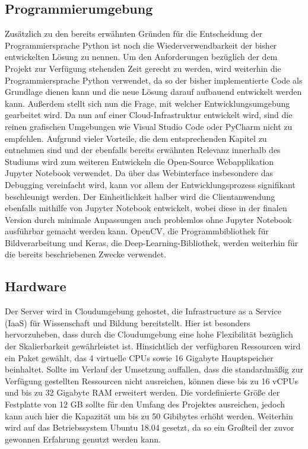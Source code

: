\documentclass[12pt, a4paper]{report}
\begin{document}
\subsection{Programmierumgebung}
Zusätzlich zu den bereits erwähnten Gründen für die Entscheidung der Programmiersprache Python ist noch die Wiederverwendbarkeit der bisher entwickelten Lösung zu nennen. Um den Anforderungen bezüglich der dem Projekt zur Verfügung stehenden Zeit gerecht zu werden, wird weiterhin die Programmiersprache Python verwendet, da so der bisher implementierte Code als Grundlage dienen kann und die neue Lösung darauf aufbauend entwickelt werden kann.
Außerdem stellt sich nun die Frage, mit welcher Entwicklungsumgebung gearbeitet wird. Da nun auf einer Cloud-Infrastruktur entwickelt wird, sind die reinen grafischen Umgebungen wie Visual Studio Code oder PyCharm nicht zu empfehlen. Aufgrund vieler Vorteile, die dem entsprechenden Kapitel zu entnehmen sind und der ebenfalls bereits erwähnten Relevanz innerhalb des Studiums wird zum weiteren Entwickeln die Open-Source Webapplikation Jupyter Notebook verwendet. Da über das Webinterface insbesondere das Debugging vereinfacht wird, kann vor allem der Entwicklungsprozess signifikant beschleunigt werden. Der Einheitlichkeit halber wird die Clientanwendung ebenfalls mithilfe von Jupyter Notebook entwickelt, wobei diese in der finalen Version durch minimale Anpassungen auch problemlos ohne Jupyter Notebook ausführbar gemacht werden kann. OpenCV, die Programmbibliothek für Bildverarbeitung und Keras, die Deep-Learning-Bibliothek, werden weiterhin für die bereits beschriebenen Zwecke verwendet.

\subsection{Hardware}
Der Server wird in Cloudumgebung gehostet, die Infrastructure as a Service (IaaS) für Wissenschaft und Bildung bereitstellt. Hier ist besonders hervorzuheben, dass durch die Cloudumgebung eine hohe Flexibilität bezüglich der Skalierbarkeit gewährleistet ist. Hinsichtlich der verfügbaren Ressourcen wird ein Paket gewählt, das 4 virtuelle CPUs sowie 16 Gigabyte Hauptspeicher beinhaltet. Sollte im Verlauf der Umsetzung auffallen, dass die standardmäßig zur Verfügung gestellten Ressourcen nicht ausreichen, können diese bis zu 16 vCPUs und bis zu 32 Gigabyte RAM erweitert werden. Die vordefinierte Größe der Festplatte von 12 GB sollte für den Umfang des Projektes ausreichen, jedoch kann auch hier die Kapazität um bis zu 50 Gibibytes erhöht werden. Weiterhin wird auf das Betriebssystem Ubuntu 18.04 gesetzt, da so ein Großteil der zuvor gewonnen Erfahrung genutzt werden kann.
\end{document}
